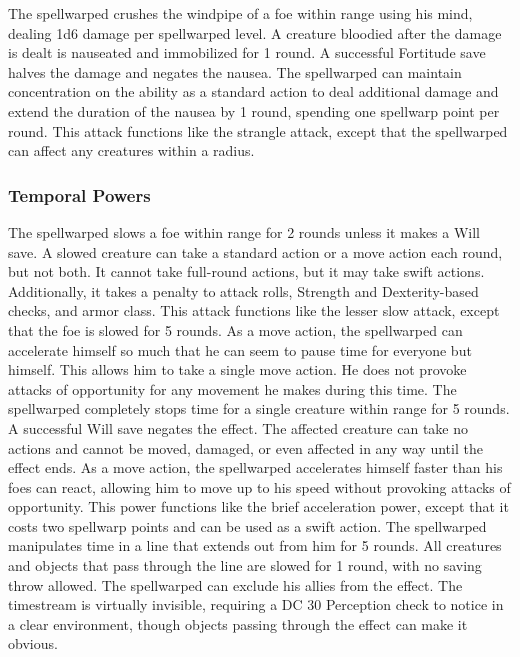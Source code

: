  The spellwarped crushes the windpipe of a foe within \rngclose range using his mind, dealing 1d6 damage per spellwarped level. A creature bloodied after the damage is dealt is nauseated and immobilized for 1 round. A successful Fortitude save halves the damage and negates the nausea. The spellwarped can maintain concentration on the ability as a standard action to deal additional damage and extend the duration of the nausea by 1 round, spending one spellwarp point per round.
 This attack functions like the strangle attack, except that the spellwarped can affect any creatures within a \areasmall radius.

\subsubsection{Temporal Powers}
 The spellwarped slows a foe within \rngclose range for 2 rounds unless it makes a Will save. A slowed creature can take a standard action or a move action each round, but not both. It cannot take full-round actions, but it may take swift actions. Additionally, it takes a  penalty to attack rolls, Strength and Dexterity-based checks, and armor class.
 This attack functions like the lesser slow attack, except that the foe is slowed for 5 rounds.
 As a move action, the spellwarped can accelerate himself so much that he can seem to pause time for everyone but himself. This allows him to take a single move action. He does not provoke attacks of opportunity for any movement he makes during this time.
 The spellwarped completely stops time for a single creature within \rngclose range for 5 rounds. A successful Will save negates the effect. The affected creature can take no actions and cannot be moved, damaged, or even affected in any way until the effect ends.
 As a move action, the spellwarped accelerates himself faster than his foes can react, allowing him to move up to his speed without provoking attacks of opportunity.
 This power functions like the brief acceleration power, except that it costs two spellwarp points and can be used as a swift action.
 The spellwarped manipulates time in a \arealarge line that extends out from him for 5 rounds. All creatures and objects that pass through the line are slowed for 1 round, with no saving throw allowed. The spellwarped can exclude his allies from the effect. The timestream is virtually invisible, requiring a DC 30 Perception check to notice in a clear environment, though objects passing through the effect can make it obvious.
